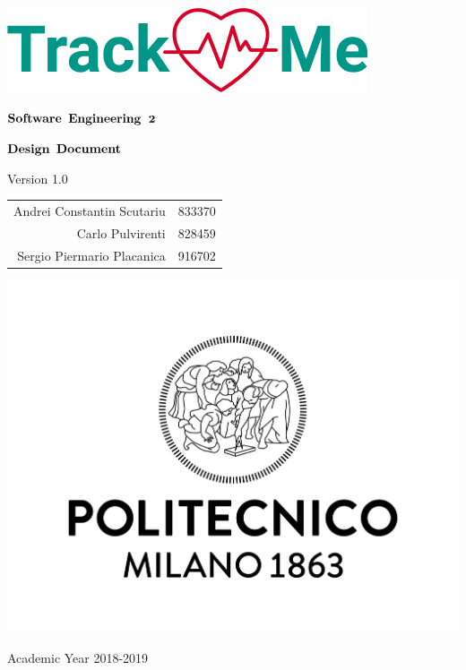 \documentclass{article}
\date{}
\title{}
\begin{document}

\thispagestyle{empty} %
\begin{center}
	\includegraphics[scale=0.8]{images/mockup/logo2.png}



	\vspace{3cm}

	\large $\bf \large Software$ $\bf Engineering$ $\bf 2$

	\vspace{3mm}

	\LARGE $\bf Design$  $\bf Document$

	\vspace{2mm}
	\small Version 1.0

	\vspace{1cm}

	\begin{tabular}{r|l}
		\large Andrei Constantin Scutariu & \large 833370\\
		\large Carlo Pulvirenti & \large 828459\\
		\large Sergio Piermario Placanica & \large 916702\\
	\end{tabular}

	\vspace{3cm}

	\includegraphics[scale=0.15]{images/logoPolimi.jpg}

	\vspace{3mm}
	Academic Year 2018-2019


	\end{center}
\end{document}
